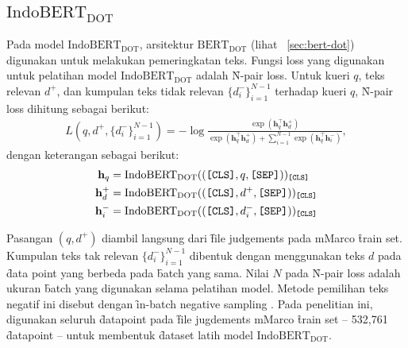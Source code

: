 \subsection{$\text{IndoBERT}_{\text{DOT}}$}
Pada model $\text{IndoBERT}_{\text{DOT}}$, arsitektur $\text{BERT}_\text{DOT}$ (lihat \sect~\ref{sec:bert-dot}) digunakan untuk melakukan pemeringkatan teks. Fungsi loss yang digunakan untuk pelatihan model $\text{IndoBERT}_{\text{DOT}}$ adalah \f{N-pair loss}. Untuk kueri $q$, teks relevan $d^+$, dan kumpulan teks tidak relevan $\{d_i^-\}_{i=1}^{N-1}$ terhadap kueri $q$, \f{N-pair loss} dihitung sebagai berikut:
\begin{align}
    L(q, d^+,\{d_i^-\}_{i=1}^{N-1}) = -\log \frac{\exp(\mathbf{h}^{\top}_q \mathbf{h}^+_d)}{\exp(\mathbf{h}^{\top}_q \mathbf{h}^+_d) + \sum_{i=1}^{N-1} \exp(\mathbf{h}^{\top}_q \mathbf{h}^-_i)},
\end{align}
dengan keterangan sebagai berikut:
\begin{align*}
\mathbf{h}_q   &= \text{IndoBERT}_{\text{DOT}}((\texttt{[CLS]}, q, \texttt{[SEP]}))_{\texttt{[CLS]}} \\  
\mathbf{h}^+_d &= \text{IndoBERT}_{\text{DOT}}((\texttt{[CLS]}, d^+, \texttt{[SEP]}))_{\texttt{[CLS]}} \\
\mathbf{h}^-_i &= \text{IndoBERT}_{\text{DOT}}((\texttt{[CLS]}, d^-_i, \texttt{[SEP]}))_{\texttt{[CLS]}} \\  
\end{align*}
    

Pasangan $(q,d^+)$ diambil langsung dari \f{file judgements} pada mMarco \f{train set}. Kumpulan teks tak relevan $\{d_i^-\}_{i=1}^{N-1}$ dibentuk dengan menggunakan teks $d$ pada \f{data point} yang berbeda pada \f{batch} yang sama. Nilai $N$ pada \f{N-pair loss} adalah ukuran \f{batch} yang digunakan selama pelatihan model. Metode pemilihan teks negatif ini disebut dengan \f{in-batch negative sampling} \citep{dprmeta}. Pada penelitian ini, digunakan seluruh \f{datapoint} pada \f{file jugdements} mMarco \f{train set} -- 532,761 \f{datapoint} -- untuk membentuk \f{dataset} latih model $\text{IndoBERT}_{\text{DOT}}$.

